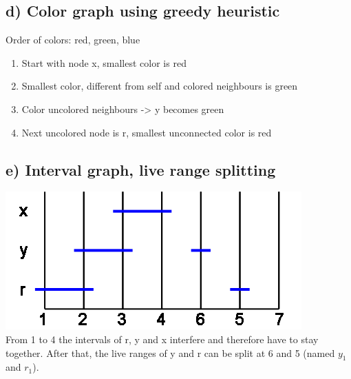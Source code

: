 \documentclass[11pt,a4paper]{scrartcl}
\begin{document}
\subsection*{d) Color graph using greedy heuristic}
Order of colors: red, green, blue
\begin{enumerate}
\item Start with node x, smallest color is red
\item Smallest color, different from self and colored neighbours is green
\item Color uncolored neighbours -> y becomes green
\item Next uncolored node is r, smallest unconnected color is red
\end{enumerate}

\subsection*{e) Interval graph, live range splitting}
\includegraphics[scale=.8]{1e}\\
From 1 to 4 the intervals of r, y and x interfere and therefore have to stay together.
After that, the live ranges of y and r can be split at 6 and 5 (named $y_1$ and $r_1$).
\end{document}
